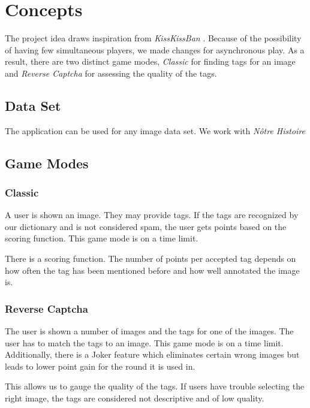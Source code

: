 \section{Concepts}
\label{gXLII:sec:concepts} %


The project idea draws inspiration from \textit{KissKissBan} \cite{10.1145/1600150.1600153}. 
Because of the possibility of having few simultaneous players, we made changes for asynchronous play. As a result, there are two distinct game modes, \emph{Classic} for finding tags for an image and \emph{Reverse Captcha} for assessing the quality of the tags.



\subsection{Data Set}
The application can be used for any image data set. We work with \textit{Nôtre Histoire}

\subsection{Game Modes}

\subsubsection{Classic}

A user is shown an image. They may provide tags. If the tags are recognized by our dictionary and is not considered spam, the user gets points based on the scoring function.
This game mode is on a time limit.

There is a scoring function. The number of points per accepted tag depends on how often the tag has been mentioned before and how well annotated the image is. 

\subsubsection{Reverse Captcha}

The user is shown a number of images and the tags for one of the images. The user has to match the tags to an image.  
This game mode is on a time limit. Additionally, there is a Joker feature which eliminates certain wrong images but leads to lower point gain for the round it is used in.

This allows us to gauge the quality of the tags. If users have trouble selecting the right image, the tags are considered not descriptive and of low quality.


